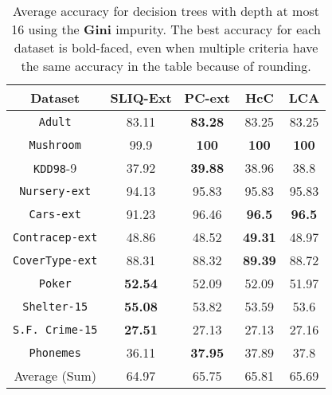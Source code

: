 \documentclass{article}
\begin{document}
\begin{table}
\small
\centering
\begin{tabular}{c|c|c|c|c} 
Dataset             &  SLIQ-Ext    & PC-ext       & HcC         & LCA        \\
\hline
{\tt Adult}         &  83.11       & {\bf 83.28}  & 83.25       & 83.25      \\
{\tt Mushroom}      &  99.9        & {\bf 100 }   & {\bf 100 }  & {\bf 100}  \\
{\tt KDD98}-9       &  37.92       & {\bf 39.88}  & 38.96       & 38.8       \\
{\tt Nursery-ext}   &  94.13       & 95.83        & 95.83       & 95.83      \\
{\tt Cars-ext}      &  91.23       & 96.46        & {\bf 96.5}  & {\bf 96.5} \\
{\tt Contracep-ext} &  48.86       & 48.52        & {\bf 49.31} & 48.97      \\
{\tt CoverType-ext} &  88.31       & 88.32        & {\bf 89.39} & 88.72      \\
{\tt Poker}         &  {\bf 52.54} & 52.09        & 52.09       & 51.97      \\
{\tt Shelter-15}    &  {\bf 55.08} & 53.82        & 53.59       & 53.6       \\
{\tt S.F. Crime-15} &  {\bf 27.51} & 27.13        & 27.13       & 27.16      \\
{\tt Phonemes}      &  36.11       &{\bf 37.95}   & 37.89       & 37.8       \\
\hline
Average (Sum)       &  64.97       & 65.75        & 65.81       & 65.69
\end{tabular}
\normalsize
\caption{Average accuracy for decision trees with depth at most 16 using the {\bf Gini} impurity. The best accuracy for each dataset is bold-faced, even when multiple criteria have the same accuracy in the table because of rounding.}
\label{tab:nominal-16-gini}
\end{table}
\end{document}

